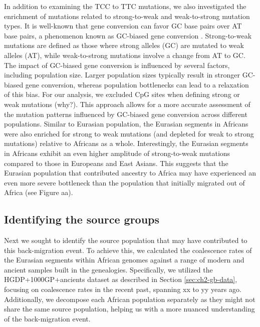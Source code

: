 In addition to examining the TCC to TTC mutations, we also investigated the enrichment of mutations related to strong-to-weak and weak-to-strong mutation types. It is well-known that gene conversion can favor GC base pairs over AT base pairs, a phenomenon known as GC-biased gene conversion \cite{duret2009biased}. Strong-to-weak mutations are defined as those where strong alleles (GC) are mutated to weak alleles (AT), while weak-to-strong mutations involve a change from AT to GC. The impact of GC-biased gene conversion is influenced by several factors, including population size. Larger population sizes typically result in stronger GC-biased gene conversion, whereas population bottlenecks can lead to a relaxation of this bias. For our analysis, we excluded CpG sites when defining strong or weak mutations (why?). This approach allows for a more accurate assessment of the mutation patterns influenced by GC-biased gene conversion across different populations. Similar to Eurasian population, the Eurasian segments in Africans were also enriched for strong to weak mutations (and depleted for weak to strong mutations) relative to Africans as a whole. Interestingly, the Eurasian segments in Africans exhibit an even higher amplitude of strong-to-weak mutations compared to those in Europeans and East Asians. This suggests that the Eurasian population that contributed ancestry to Africa may have experienced an even more severe bottleneck than the population that initially migrated out of Africa (see Figure aa). 

\subsection{Identifying the source groups}

Next we sought to identify the source population that may have contributed to this back-migration event. To achieve this, we calculated the coalescence rates of the Eurasian segments within African genomes against a range of modern and ancient samples built in the genealogies. Specifically, we utilized the HGDP+1000GP+ancients dataset as described in Section \ref{sec:ch2-gb-data}, focusing on coalescence rates in the recent past, spanning xx to yy years ago. Additionally, we decompose each African population separately as they might not share the same source population, helping us with a more nuanced understanding of the back-migration event.


